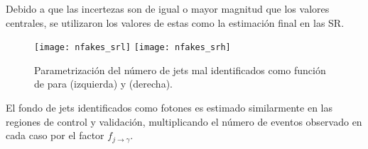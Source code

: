 Debido a que las incertezas son de igual o mayor magnitud que los valores centrales,
se utilizaron los valores de estas como la estimación final en las SR.


\begin{figure}[!htbp]
  \centering
  \texttt{[image: nfakes\_srl]}  \hfill
  \texttt{[image: nfakes\_srh]}
  \caption{Parametrización del número de jets mal identificados como
    función de {\met} para {\SRL} (izquierda) y {\SRH} (derecha).}
  \label{fig:jetfake_nfakes_met}
\end{figure}

El fondo de jets identificados como fotones es estimado similarmente en las
regiones de control y validación,
multiplicando el número de eventos observado en cada caso por el factor
$f_{j\to\gamma}$.




